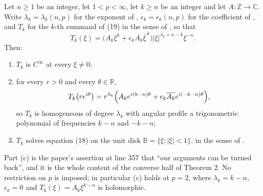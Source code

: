 \begin{lemma}
Let $n\ge1$ be an integer, let $1<p<\infty$, let $k\ge n$ be an integer and let
$A\colon\mathbb{Z}\to\mathbb{C}$.  Write $\lambda_k=\lambda_k(n,p)$ for the
exponent of , $\epsilon_k=\epsilon_k(n,p)$ for the
coefficient of , and $T_k$ for the $k$-th summand of (19) in
the sense of , so that
\[
  T_k(\xi)=\bigl(A_k\xi^k+\epsilon_k\overline{A_k}\bar\xi^{\,k}\bigr)
    |\xi|^{\lambda_k+n-k}\xi^{-n}.
\]
Then:
\begin{enumerate}
\item[(a)] $T_k$ is $C^\infty$ at every $\xi\neq0$;
\item[(b)] for every $r>0$ and every $\theta\in\mathbb{R}$,
\[
  T_k\bigl(re^{i\theta}\bigr)
  =r^{\lambda_k}\Bigl(A_ke^{i(k-n)\theta}
    +\epsilon_k\overline{A_k}e^{i(-k-n)\theta}\Bigr),
\]
so $T_k$ is homogeneous of degree $\lambda_k$ with angular profile a
trigonometric polynomial of frequencies $k-n$ and $-k-n$;
\item[(c)] $T_k$ solves equation (18) on the unit disk
$\mathbb{B}=\{\xi:|\xi|<1\}$, in the sense of .
\end{enumerate}

Part (c) is the paper's assertion at line 357 that ``our arguments can be
turned back'', and it is the whole content of the converse half of Theorem 2.
No restriction on $p$ is imposed; in particular (c) holds at $p=2$, where
$\lambda_k=k-n$, $\epsilon_k=0$ and $T_k(\xi)=A_k\xi^{k-n}$ is holomorphic.
\end{lemma}
